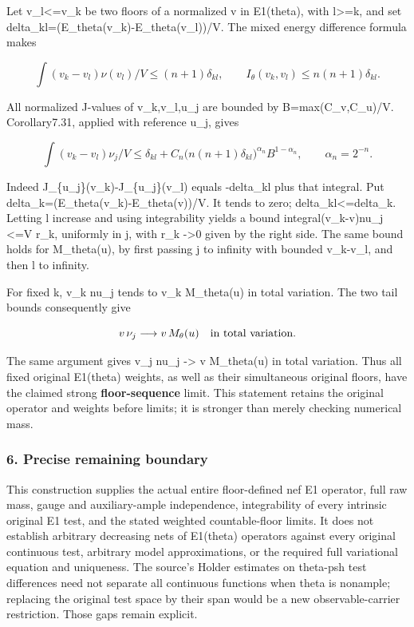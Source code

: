 \documentclass[
]{article}
\begin{document}
Let v\_l\textless=v\_k be two floors of a normalized v in E1(theta),
with l\textgreater=k, and set
delta\_kl=(E\_theta(v\_k)-E\_theta(v\_l))/V. The mixed energy difference
formula makes

\[\int(v_k-v_l)\nu(v_l)/V\leq(n+1)\delta_{kl},\qquad
I_\theta(v_k,v_l)\leq n(n+1)\delta_{kl}.\]

All normalized J-values of v\_k,v\_l,u\_j are bounded by
B=max(C\_v,C\_u)/V. Corollary7.31, applied with reference u\_j, gives

\[\int(v_k-v_l)\nu_j/V\leq\delta_{kl}
+C_n\big(n(n+1)\delta_{kl}\big)^{\alpha_n}B^{1-\alpha_n},
\qquad\alpha_n=2^{-n}.\]

Indeed J\_\{u\_j\}(v\_k)-J\_\{u\_j\}(v\_l) equals -delta\_kl plus that
integral. Put delta\_k=(E\_theta(v\_k)-E\_theta(v))/V. It tends to zero;
delta\_kl\textless=delta\_k. Letting l increase and using integrability
yields a bound integral(v\_k-v)nu\_j \textless=V r\_k, uniformly in j,
with r\_k -\textgreater0 given by the right side. The same bound holds
for M\_theta(u), by first passing j to infinity with bounded v\_k-v\_l,
and then l to infinity.

For fixed k, v\_k nu\_j tends to v\_k M\_theta(u) in total variation.
The two tail bounds consequently give

\[v\,\nu_j\longrightarrow v\,M_\theta(u)
\quad\hbox{in total variation}.\]

The same argument gives v\_j nu\_j -\textgreater{} v M\_theta(u) in
total variation. Thus all fixed original E1(theta) weights, as well as
their simultaneous original floors, have the claimed strong
\textbf{floor-sequence} limit. This statement retains the original
operator and weights before limits; it is stronger than merely checking
numerical mass.

\subsubsection{6. Precise remaining
boundary}\label{precise-remaining-boundary}

This construction supplies the actual entire floor-defined nef E1
operator, full raw mass, gauge and auxiliary-ample independence,
integrability of every intrinsic original E1 test, and the stated
weighted countable-floor limits. It does not establish arbitrary
decreasing nets of E1(theta) operators against every original continuous
test, arbitrary model approximations, or the required full variational
equation and uniqueness. The source's Holder estimates on theta-psh test
differences need not separate all continuous functions when theta is
nonample; replacing the original test space by their span would be a new
observable-carrier restriction. Those gaps remain explicit.
\end{document}
